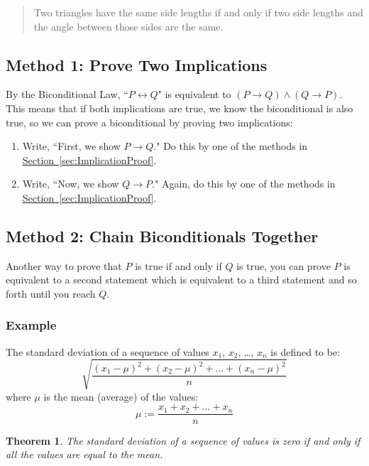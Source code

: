 \documentclass[11pt,oneside]{book}
\newtheorem{thm}{Theorem}[section]
\theoremstyle{definition}
\begin{document}
\begin{quote}
    Two triangles have the same side lengths if and only if two side lengths and the angle between those sides are the same.
\end{quote}

\subsection*{Method 1: Prove Two Implications}
By the Biconditional Law, ``$P \leftrightarrow Q$" is equivalent to $(P \rightarrow Q) \land (Q \rightarrow P)$.
This means that if both implications are true, we know the biconditional is also true, so we can prove a biconditional by proving two implications:

\begin{enumerate}
    \item Write, ``First, we show $P \rightarrow Q$."
    Do this by one of the methods in \hyperref[sec:ImplicationProof]{Section~\ref*{sec:ImplicationProof}}.

    \item Write, ``Now, we show $Q \rightarrow P$."
    Again, do this by one of the methods in \hyperref[sec:ImplicationProof]{Section~\ref*{sec:ImplicationProof}}.
\end{enumerate}

\subsection*{Method 2: Chain Biconditionals Together}
Another way to prove that $P$ is true if and only if $Q$ is true, you can prove $P$ is equivalent to a second statement which is equivalent to a third statement and so forth until you reach $Q$.

\subsubsection*{Example}
The standard deviation of a sequence of values $x_{1}$, $x_{2}$, \dots, $x_{n}$ is defined to be:
\begin{equation}
    \sqrt{\frac{(x_{1} - \mu)^{2} + (x_{2} - \mu)^{2} + \dots + (x_{n} - \mu)^{2}}{n}} \label{eq:StdDev}
\end{equation}
where $\mu$ is the mean (average) of the values:
\[ \mu := \frac{x_{1} + x_{2} + \dots + x_{n}}{n} \]

\begin{thm}
    The standard deviation of a sequence of values is zero if and only if all the values are equal to the mean.
\end{thm}
\end{document}
